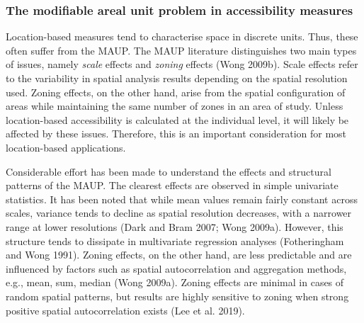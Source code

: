 \documentclass{article}
\begin{document}
\subsubsection{The modifiable areal unit problem in accessibility
measures}\label{the-modifiable-areal-unit-problem-in-accessibility-measures}

Location-based measures tend to characterise space in discrete units.
Thus, these often suffer from the MAUP. The MAUP literature
distinguishes two main types of issues, namely \emph{scale} effects and
\emph{zoning} effects (Wong 2009b). Scale effects refer to the
variability in spatial analysis results depending on the spatial
resolution used. Zoning effects, on the other hand, arise from the
spatial configuration of areas while maintaining the same number of
zones in an area of study. Unless location-based accessibility is
calculated at the individual level, it will likely be affected by these
issues. Therefore, this is an important consideration for most
location-based applications.

Considerable effort has been made to understand the effects and
structural patterns of the MAUP. The clearest effects are observed in
simple univariate statistics. It has been noted that while mean values
remain fairly constant across scales, variance tends to decline as
spatial resolution decreases, with a narrower range at lower resolutions
(Dark and Bram 2007; Wong 2009a). However, this structure tends to
dissipate in multivariate regression analyses (Fotheringham and Wong
1991). Zoning effects, on the other hand, are less predictable and are
influenced by factors such as spatial autocorrelation and aggregation
methods, e.g., mean, sum, median (Wong 2009a). Zoning effects are
minimal in cases of random spatial patterns, but results are highly
sensitive to zoning when strong positive spatial autocorrelation exists
(Lee et al. 2019).
\end{document}
